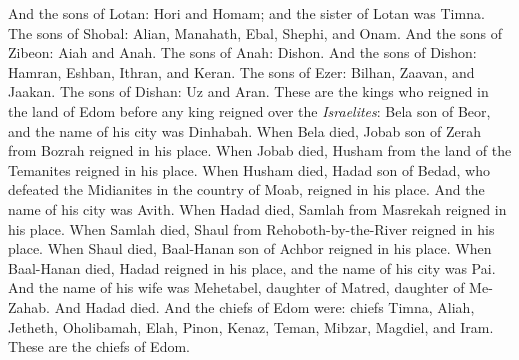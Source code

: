 \begin{biblechapter}
\verse And the sons of Lotan: Hori and Homam; and the sister of Lotan was Timna.
\verse The sons of Shobal: Alian, Manahath, Ebal, Shephi, and Onam. And the sons of Zibeon: Aiah and Anah.
\verse The sons of Anah: Dishon. And the sons of Dishon: Hamran, Eshban, Ithran, and Keran.
\verse The sons of Ezer: Bilhan, Zaavan, and Jaakan. The sons of Dishan: Uz and Aran.
\verse These are the kings who reigned in the land of Edom before any king reigned over the \textit{Israelites}: Bela son of Beor, and the name of his city was Dinhabah.
\verse When Bela died, Jobab son of Zerah from Bozrah reigned in his place.
\verse When Jobab died, Husham from the land of the Temanites reigned in his place.
\verse When Husham died, Hadad son of Bedad, who defeated the Midianites in the country of Moab, reigned in his place. And the name of his city was Avith.
\verse When Hadad died, Samlah from Masrekah reigned in his place.
\verse When Samlah died, Shaul from Rehoboth-by-the-River reigned in his place.
\verse When Shaul died, Baal-Hanan son of Achbor reigned in his place.
\verse When Baal-Hanan died, Hadad reigned in his place, and the name of his city was Pai. And the name of his wife was Mehetabel, daughter of Matred, daughter of Me-Zahab.
\verse And Hadad died. And the chiefs of Edom were: chiefs Timna, Aliah, Jetheth,
\verse Oholibamah, Elah, Pinon,
\verse Kenaz, Teman, Mibzar,
\verse Magdiel, and Iram. These are the chiefs of Edom.
\end{biblechapter}


